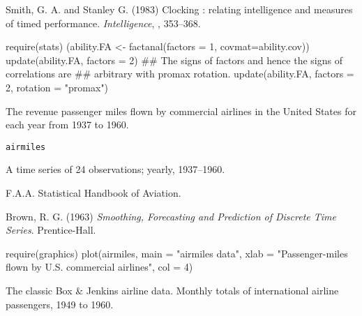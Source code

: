 %
\begin{References}\relax
Smith, G. A. and Stanley G. (1983)
Clocking : relating intelligence and measures of timed
performance. \emph{Intelligence}, , 353--368.
\end{References}
%
\begin{Examples}
\begin{ExampleCode}

require(stats)
(ability.FA <- factanal(factors = 1, covmat=ability.cov))
update(ability.FA, factors = 2)
## The signs of factors and hence the signs of correlations are
## arbitrary with promax rotation.
update(ability.FA, factors = 2, rotation = "promax")
\end{ExampleCode}
\end{Examples}
%
\begin{Description}\relax
The revenue passenger miles flown by commercial airlines in
the United States for each year from 1937 to 1960.
\end{Description}
%
\begin{Usage}
\begin{verbatim}
airmiles
\end{verbatim}
\end{Usage}
%
\begin{Format}
A time series of 24 observations; yearly, 1937--1960.
\end{Format}
%
\begin{Source}\relax
F.A.A. Statistical Handbook of Aviation.
\end{Source}
%
\begin{References}\relax
Brown, R. G. (1963)
\emph{Smoothing, Forecasting and Prediction of Discrete Time Series}.
Prentice-Hall.
\end{References}
%
\begin{Examples}
\begin{ExampleCode}
require(graphics)
plot(airmiles, main = "airmiles data",
     xlab = "Passenger-miles flown by U.S. commercial airlines", col = 4)
\end{ExampleCode}
\end{Examples}
%
\begin{Description}\relax
The classic Box \& Jenkins airline data.  Monthly totals of
international airline passengers, 1949 to 1960.
\end{Description}
